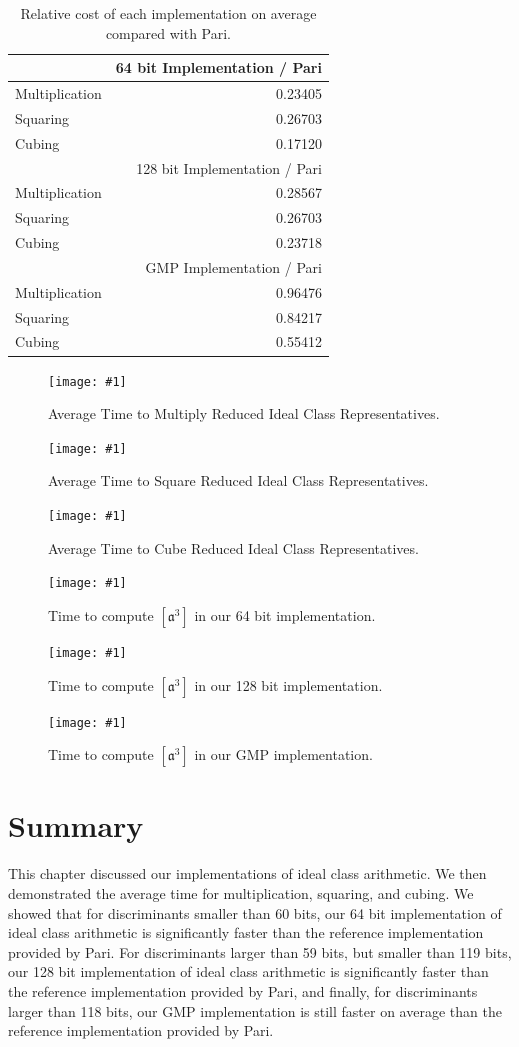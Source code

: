 \documentclass{ucalgthes1}
\theoremstyle{definition}
\newcommand{\mygraph}[3]{
	\begin{figure}[htb]
	\centering
	\texttt{[image: \#1]}
	\caption{#3}
	\label{#2}
	\end{figure}
}
\begin{document}
\begin{table}[htb]
\centering
\begin{tabular}{| l | r |}
	\hline
	           & 64 bit Implementation / Pari \\
	\hline
Multiplication & 0.23405 \\
Squaring       & 0.26703 \\
Cubing         & 0.17120 \\
	\hline
	\hline
	           & 128 bit Implementation / Pari \\
	\hline
Multiplication & 0.28567 \\
Squaring       & 0.26703 \\
Cubing         & 0.23718 \\
	\hline
	\hline
	           & GMP Implementation / Pari \\
	\hline
Multiplication & 0.96476 \\
Squaring       & 0.84217 \\
Cubing         & 0.55412 \\
	\hline
\end{tabular}
\caption[Relative Average Cost of Ideal Arithmetic.]{Relative cost of each implementation on average compared with Pari.}
\label{tab:relativeCostIdealArith}
\end{table}

\mygraph{compose-all}{fig:idealCompose}{Average Time to Multiply Reduced Ideal Class Representatives.}
\mygraph{square-all}{fig:idealSquare}{Average Time to Square Reduced Ideal Class Representatives.}
\mygraph{cube-all}{fig:idealCube}{Average Time to Cube Reduced Ideal Class Representatives.}

\mygraph{cube-vs-64}{fig:cubingVs64}{Time to compute $[\mathfrak a^3]$ in our 64 bit implementation.}
\mygraph{cube-vs-128}{fig:cubingVs128}{Time to compute $[\mathfrak a^3]$ in our 128 bit implementation.}
\mygraph{cube-vs-mpz}{fig:cubingVsMpz}{Time to compute $[\mathfrak a^3]$ in our GMP implementation.}

\clearpage

\section{Summary}

This chapter discussed our implementations of ideal class arithmetic.  We then demonstrated the average time for multiplication, squaring, and cubing.  We showed that for discriminants smaller than 60 bits, our 64 bit implementation of ideal class arithmetic is significantly faster than the reference implementation provided by Pari.  For discriminants larger than 59 bits, but smaller than 119 bits, our 128 bit implementation of ideal class arithmetic is significantly faster than the reference implementation provided by Pari, and finally, for discriminants larger than 118 bits, our GMP implementation is still faster on average than the reference implementation provided by Pari.
\end{document}
